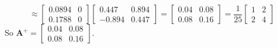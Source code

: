 \documentclass{article}
\newcommand{\mat}[1]{\bm{#1}}  %
\begin{document}
\begin{enumerate}
    \[ \approx \begin{bmatrix} 0.0894 & 0 \\ 0.1788 & 0 \end{bmatrix} \begin{bmatrix} 0.447 & 0.894 \\ -0.894 & 0.447 \end{bmatrix} = \begin{bmatrix} 0.04 & 0.08 \\ 0.08 & 0.16 \end{bmatrix} = \frac{1}{25} \begin{bmatrix} 1 & 2 \\ 2 & 4 \end{bmatrix} \]
    So $\mat{A}^{+} = \begin{bmatrix} 0.04 & 0.08 \\ 0.08 & 0.16 \end{bmatrix}$.


\end{enumerate}
\end{document}
